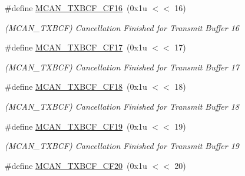 \begin{DoxyCompactItemize}
\mbox{\label{group__SAMV71__MCAN_gab29e85e19154f70f0174511063f6aef7}} 
\#define \mbox{\hyperlink{group__SAMV71__MCAN_gab29e85e19154f70f0174511063f6aef7}{M\+C\+A\+N\+\_\+\+T\+X\+B\+C\+F\+\_\+\+C\+F16}}~(0x1u $<$$<$ 16)
\begin{DoxyCompactList}\small\item\em (M\+C\+A\+N\+\_\+\+T\+X\+B\+CF) Cancellation Finished for Transmit Buffer 16 \end{DoxyCompactList}\item 
\mbox{\label{group__SAMV71__MCAN_gabe3b52e31b2f04cd15443a2aeb008138}} 
\#define \mbox{\hyperlink{group__SAMV71__MCAN_gabe3b52e31b2f04cd15443a2aeb008138}{M\+C\+A\+N\+\_\+\+T\+X\+B\+C\+F\+\_\+\+C\+F17}}~(0x1u $<$$<$ 17)
\begin{DoxyCompactList}\small\item\em (M\+C\+A\+N\+\_\+\+T\+X\+B\+CF) Cancellation Finished for Transmit Buffer 17 \end{DoxyCompactList}\item 
\mbox{\label{group__SAMV71__MCAN_ga1f487f9f9111114f2e422753f085ec84}} 
\#define \mbox{\hyperlink{group__SAMV71__MCAN_ga1f487f9f9111114f2e422753f085ec84}{M\+C\+A\+N\+\_\+\+T\+X\+B\+C\+F\+\_\+\+C\+F18}}~(0x1u $<$$<$ 18)
\begin{DoxyCompactList}\small\item\em (M\+C\+A\+N\+\_\+\+T\+X\+B\+CF) Cancellation Finished for Transmit Buffer 18 \end{DoxyCompactList}\item 
\mbox{\label{group__SAMV71__MCAN_gaf9f26b78d3ed296ae19145df6e770fef}} 
\#define \mbox{\hyperlink{group__SAMV71__MCAN_gaf9f26b78d3ed296ae19145df6e770fef}{M\+C\+A\+N\+\_\+\+T\+X\+B\+C\+F\+\_\+\+C\+F19}}~(0x1u $<$$<$ 19)
\begin{DoxyCompactList}\small\item\em (M\+C\+A\+N\+\_\+\+T\+X\+B\+CF) Cancellation Finished for Transmit Buffer 19 \end{DoxyCompactList}\item 
\mbox{\label{group__SAMV71__MCAN_ga6b91e503a90f1c37c6dd0384fcfe6c42}} 
\#define \mbox{\hyperlink{group__SAMV71__MCAN_ga6b91e503a90f1c37c6dd0384fcfe6c42}{M\+C\+A\+N\+\_\+\+T\+X\+B\+C\+F\+\_\+\+C\+F20}}~(0x1u $<$$<$ 20)
$$
\end{DoxyCompactItemize}
